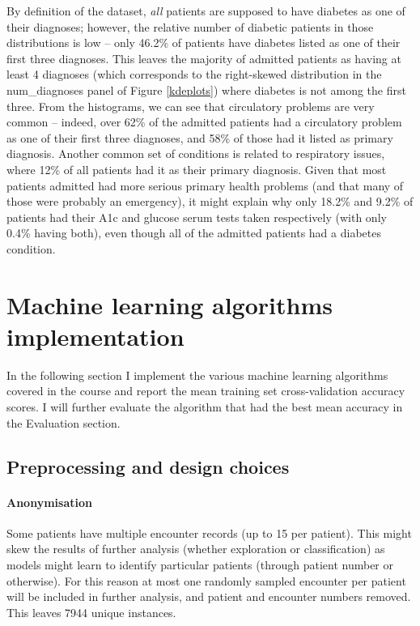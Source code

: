 \documentclass[10pt, twocolumn]{article}
\begin{document}
By definition of the dataset, \textit{all} patients are supposed to have diabetes as one of their diagnoses; however, the relative number of diabetic patients in those distributions is low -- only 46.2\% of patients have diabetes listed as one of their first three diagnoses. This leaves the majority of admitted patients as having at least 4 diagnoses (which corresponds to the right-skewed distribution in the num\_diagnoses panel of Figure \ref{kdeplots}) where diabetes is not among the first three. From the histograms, we can see that circulatory problems are very common -- indeed, over 62\% of the admitted patients had a circulatory problem as one of their first three diagnoses, and 58\% of those had it listed as primary diagnosis. Another common set of conditions is related to respiratory issues, where 12\% of all patients had it as their primary diagnosis. Given that most patients admitted had more serious primary health problems (and that many of those were probably an emergency), it might explain why only 18.2\% and 9.2\% of patients had their A1c and glucose serum tests taken respectively (with only 0.4\% having both), even though all of the admitted patients had a diabetes condition.


\section{Machine learning algorithms implementation}

In the following section I implement the various machine learning algorithms covered in the course and report the mean training set cross-validation accuracy scores. I will further evaluate the algorithm that had the best mean accuracy in the Evaluation section.

\subsection{Preprocessing and design choices}

\paragraph{Anonymisation} Some patients have multiple encounter records (up to 15 per patient). This might skew the results of further analysis (whether exploration or classification) as models might learn to identify particular patients (through patient number or otherwise). For this reason at most one randomly sampled encounter per patient will be included in further analysis, and patient and encounter numbers removed. This leaves 7944 unique instances.
\end{document}
